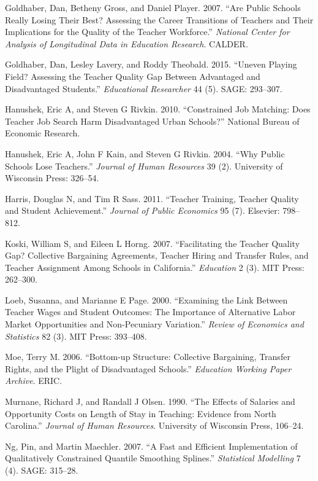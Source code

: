 \documentclass[]{article}
\begin{document}
\hypertarget{ref-goldhaber2007}{}
Goldhaber, Dan, Betheny Gross, and Daniel Player. 2007. ``Are Public
Schools Really Losing Their Best? Assessing the Career Transitions of
Teachers and Their Implications for the Quality of the Teacher
Workforce.'' \emph{National Center for Analysis of Longitudinal Data in
Education Research}. CALDER.

\hypertarget{ref-goldhaber2015}{}
Goldhaber, Dan, Lesley Lavery, and Roddy Theobald. 2015. ``Uneven
Playing Field? Assessing the Teacher Quality Gap Between Advantaged and
Disadvantaged Students.'' \emph{Educational Researcher} 44 (5). SAGE:
293--307.

\hypertarget{ref-hanushek2010}{}
Hanushek, Eric A, and Steven G Rivkin. 2010. ``Constrained Job Matching:
Does Teacher Job Search Harm Disadvantaged Urban Schools?'' National
Bureau of Economic Research.

\hypertarget{ref-hanushek}{}
Hanushek, Eric A, John F Kain, and Steven G Rivkin. 2004. ``Why Public
Schools Lose Teachers.'' \emph{Journal of Human Resources} 39 (2).
University of Wisconsin Press: 326--54.

\hypertarget{ref-harris}{}
Harris, Douglas N, and Tim R Sass. 2011. ``Teacher Training, Teacher
Quality and Student Achievement.'' \emph{Journal of Public Economics} 95
(7). Elsevier: 798--812.

\hypertarget{ref-koski}{}
Koski, William S, and Eileen L Horng. 2007. ``Facilitating the Teacher
Quality Gap? Collective Bargaining Agreements, Teacher Hiring and
Transfer Rules, and Teacher Assignment Among Schools in California.''
\emph{Education} 2 (3). MIT Press: 262--300.

\hypertarget{ref-loeb}{}
Loeb, Susanna, and Marianne E Page. 2000. ``Examining the Link Between
Teacher Wages and Student Outcomes: The Importance of Alternative Labor
Market Opportunities and Non-Pecuniary Variation.'' \emph{Review of
Economics and Statistics} 82 (3). MIT Press: 393--408.

\hypertarget{ref-moe}{}
Moe, Terry M. 2006. ``Bottom-up Structure: Collective Bargaining,
Transfer Rights, and the Plight of Disadvantaged Schools.''
\emph{Education Working Paper Archive}. ERIC.

\hypertarget{ref-murnane}{}
Murnane, Richard J, and Randall J Olsen. 1990. ``The Effects of Salaries
and Opportunity Costs on Length of Stay in Teaching: Evidence from North
Carolina.'' \emph{Journal of Human Resources}. University of Wisconsin
Press, 106--24.

\hypertarget{ref-ng}{}
Ng, Pin, and Martin Maechler. 2007. ``A Fast and Efficient
Implementation of Qualitatively Constrained Quantile Smoothing
Splines.'' \emph{Statistical Modelling} 7 (4). SAGE: 315--28.
\end{document}
